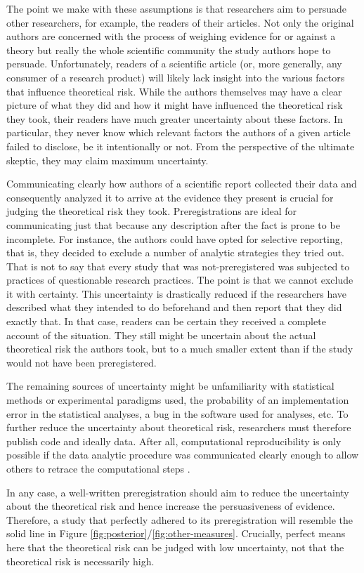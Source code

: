 \documentclass[jou,a4paper]{apa7}
\begin{document}
The point we make with these assumptions is that researchers aim to persuade other researchers, for example, the readers of their articles.
Not only the original authors are concerned with the process of weighing evidence for or against a theory but really the whole scientific community the study authors hope to persuade.
Unfortunately, readers of a scientific article (or, more generally, any consumer of a research product) will likely lack insight into the various factors that influence theoretical risk.
While the authors themselves may have a clear picture of what they did and how it might have influenced the theoretical risk they took, their readers have much greater uncertainty about these factors.
In particular, they never know which relevant factors the authors of a given article failed to disclose, be it intentionally or not.
From the perspective of the ultimate skeptic, they may claim maximum uncertainty.\par
Communicating clearly how authors of a scientific report collected their data and consequently analyzed it to arrive at the evidence they present is crucial for judging the theoretical risk they took.
Preregistrations are ideal for communicating just that because any description after the fact is prone to be incomplete.
For instance, the authors could have opted for selective reporting, that is, they decided to exclude a number of analytic strategies they tried out.
That is not to say that every study that was not-preregistered was subjected to practices of questionable research practices.
The point is that we cannot exclude it with certainty.
This uncertainty is drastically reduced if the researchers have described what they intended to do beforehand and then report that they did exactly that.
In that case, readers can be certain they received a complete account of the situation.
They still might be uncertain about the actual theoretical risk the authors took, but to a much smaller extent than if the study would not have been preregistered.\par
The remaining sources of uncertainty might be unfamiliarity with statistical methods or experimental paradigms used, the probability of an implementation error in the statistical analyses, a bug in the software used for analyses, etc.
To further reduce the uncertainty about theoretical risk, researchers must therefore publish code and ideally data.
After all, computational reproducibility is only possible if the data analytic procedure was communicated clearly enough to allow others to retrace the computational steps \parencite{peikertReproducibleDataAnalysis2021}.\par
In any case, a well-written preregistration should aim to reduce the uncertainty about the theoretical risk and hence increase the persuasiveness of evidence.
Therefore, a study that perfectly adhered to its preregistration will resemble the solid line in Figure \ref{fig:posterior}/\ref{fig:other-measures}.
Crucially, perfect means here that the theoretical risk can be judged with low uncertainty, not that the theoretical risk is necessarily high.
\end{document}
